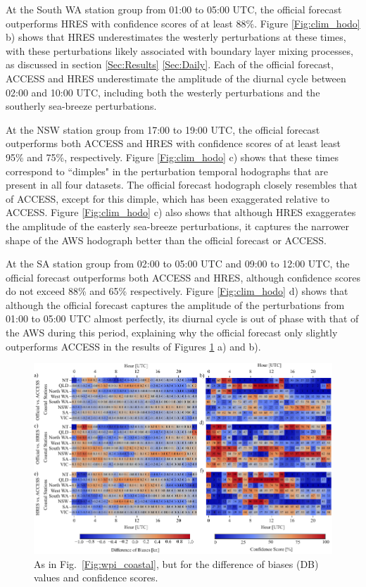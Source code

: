 \documentclass{ametsoc}
\begin{document}
At the South WA station group from 01:00 to 05:00 UTC, the official forecast outperforms HRES with confidence scores of at least $88\%$. Figure \ref{Fig:clim_hodo} b) shows that HRES underestimates the westerly perturbations at these times, with these perturbations likely associated with boundary layer mixing processes, as discussed in section \ref{Sec:Results} \ref{Sec:Daily}. Each of the official forecast, ACCESS and HRES underestimate the amplitude of the diurnal cycle between 02:00 and 10:00 UTC, including both the westerly perturbations and the southerly sea-breeze perturbations. 

At the NSW station group from 17:00 to 19:00 UTC, the official forecast outperforms both ACCESS and HRES with confidence scores of at least least 95\% and 75\%, respectively. Figure \ref{Fig:clim_hodo} c) shows that these times correspond to ``dimples" in the perturbation temporal hodographs that are present in all four datasets. The official forecast hodograph closely resembles that of ACCESS, except for this dimple, which has been exaggerated relative to ACCESS. Figure \ref{Fig:clim_hodo} c) also shows that although HRES exaggerates the amplitude of the easterly sea-breeze perturbations, it captures the narrower shape of the AWS hodograph better than the official forecast or ACCESS.

At the SA station group from 02:00 to 05:00 UTC and 09:00 to 12:00 UTC, the official forecast outperforms both ACCESS and HRES, although confidence scores do not exceed 88\% and 65\% respectively. Figure \ref{Fig:clim_hodo} d) shows that although the official forecast captures the amplitude of the perturbations from 01:00 to 05:00 UTC almost perfectly, its diurnal cycle is out of phase with that of the AWS during this period, explaining why the official forecast only slightly outperforms ACCESS in the results of Figures \ref{Fig:cwpi_coastal} a) and b).

\begin{figure}
\centering
\includegraphics[width=39pc]{cwpi_coastal.pdf}
\caption{As in Fig.~\ref{Fig:wpi_coastal}, but for the difference of biases (DB) values and confidence scores.}
\label{Fig:cwpi_coastal}
\end{figure}
\end{document}
